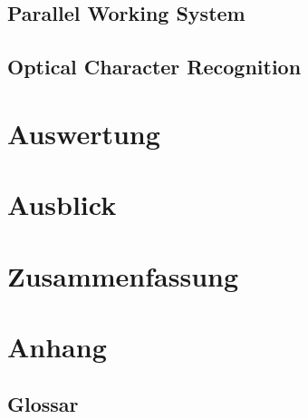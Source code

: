 \documentclass[12pt]{article}
\begin{document}
\newpage

\subsection{Parallel Working System}
\label{subsec:parallelws}


\newpage

\subsection{Optical Character Recognition}
\label{subsec:ocr}


\newpage %

\section{Auswertung}
\label{sec:auswertung}


\newpage %

\section{Ausblick}
\label{sec:ausblick}


\newpage %

\section{Zusammenfassung}
\label{sec:zusammenfassung}


\newpage %

\cfoot{}
\section*{Anhang}
\label{sec:anhang}

\subsection*{Glossar}
\label{subsec:glossar}
\begingroup
\renewcommand{\section}[2]{}
\printglossary[style=tree]
\endgroup
\newpage
\end{document}
